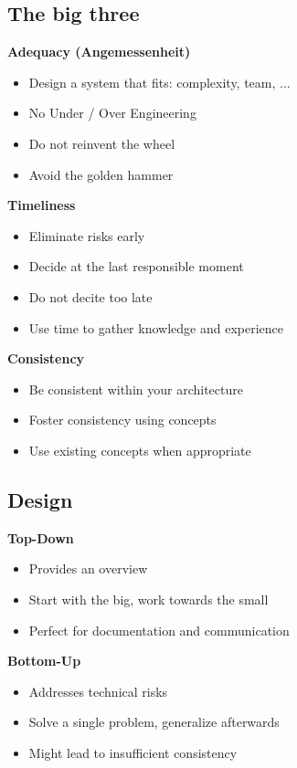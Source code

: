 \subsection{The big three}
\textbf{Adequacy (Angemessenheit)}
\begin{itemize}
    \item Design a system that fits: complexity, team, ...
    \item No Under / Over Engineering
    \item Do not reinvent the wheel
    \item Avoid the golden hammer
\end{itemize}
\textbf{Timeliness}
\begin{itemize}
    \item Eliminate risks early
    \item Decide at the last responsible moment
    \item Do not decite too late
    \item Use time to gather knowledge and experience
\end{itemize}
\textbf{Consistency}
\begin{itemize}
    \item Be consistent within your architecture
    \item Foster consistency using concepts
    \item Use existing concepts when appropriate
\end{itemize}

\subsection{Design}
\textbf{Top-Down}
\begin{itemize}
    \item Provides an overview
    \item Start with the big, work towards the small
    \item Perfect for documentation and communication
\end{itemize}
\textbf{Bottom-Up}
\begin{itemize}
    \item Addresses technical risks
    \item Solve a single problem, generalize afterwards
    \item Might lead to insufficient consistency
\end{itemize}

